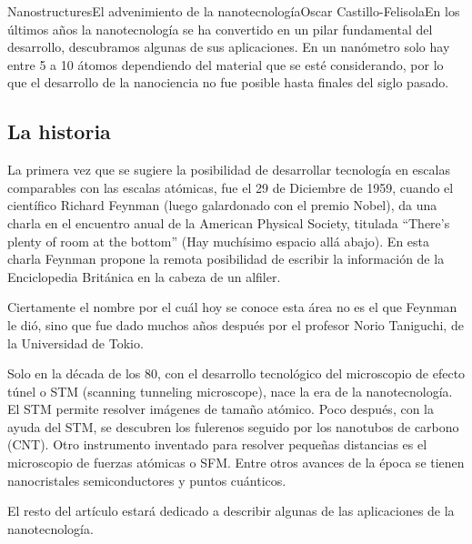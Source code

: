 \begin{article}{Nanostructures}{El advenimiento de la nanotecnolog\'ia}{Oscar Castillo-Felisola}{En los \'ultimos a\~nos la nanotecnolog\'ia se ha convertido en un pilar fundamental del desarrollo, descubramos algunas de sus aplicaciones.}
En un nan\'ometro solo hay entre 5 a 10 \'atomos dependiendo del material que se est\'e considerando, por lo que el desarrollo de la nanociencia no fue posible hasta finales del siglo pasado.



\subsection{La historia}

La primera vez que se sugiere la posibilidad de desarrollar tecnolog\'ia en escalas comparables con las escalas at\'omicas, fue el 29 de Diciembre de 1959, cuando  el cient\'ifico Richard Feynman (luego galardonado con el premio Nobel), da una charla  en el encuentro anual de la American Physical  Society, titulada ``There's plenty of room at the bottom'' (Hay much\'isimo espacio all\'a abajo). En esta charla Feynman propone la remota posibilidad de escribir la informaci\'on de la Enciclopedia Brit\'anica en la cabeza de un alfiler.

Ciertamente el nombre por el cu\'al hoy se conoce esta \'area no es el que Feynman le di\'o, sino que fue dado muchos a\~nos despu\'es por el profesor Norio Taniguchi, de la Universidad de Tokio.


Solo en la d\'ecada de los 80, con el desarrollo tecnol\'ogico del microscopio de efecto t\'unel o STM (scanning 
tunneling microscope), nace la era de la nanotecnolog\'ia. El STM permite resolver im\'agenes de tama\~no at\'omico.
Poco despu\'es, con la ayuda del STM, se descubren los fulerenos seguido por los nanotubos de carbono (CNT). Otro instrumento inventado para resolver peque\~nas distancias es el microscopio de fuerzas at\'omicas o SFM. Entre otros avances de la \'epoca se tienen  nanocristales semiconductores y  puntos cu\'anticos.

El resto del art\'iculo estar\'a dedicado a describir algunas de las aplicaciones de la nanotecnolog\'ia.%




\end{article}
